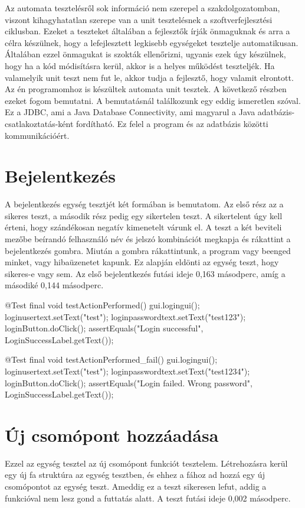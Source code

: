 
Az automata tesztelésről sok információ nem szerepel a szakdolgozatomban, viszont kihagyhatatlan szerepe van a unit tesztelésnek a szoftverfejlesztési ciklusban. Ezeket a teszteket általában a fejlesztők írják önmaguknak és arra a célra készülnek, hogy a lefejlesztett legkisebb egységeket tesztelje automatikusan. Általában ezzel önmagukat is szokták ellenőrizni, ugyanis ezek úgy készülnek, hogy ha a kód módisításra kerül, akkor is a helyes működést teszteljék. Ha valamelyik unit teszt nem fut le, akkor tudja a fejlesztő, hogy valamit elrontott.\\

Az én programomhoz is készültek automata unit tesztek. A következő részben ezeket fogom bemutatni. A bemutatásnál találkozunk egy eddig ismeretlen szóval. Ez a JDBC, ami a Java Database Connectivity, ami magyarul a Java adatbázis-csatlakoztatás-ként fordítható. Ez felel a program és az adatbázis közötti kommunikációért.

\section{Bejelentkezés} A bejelentkezés egység tesztjét két formában is bemutatom. Az első rész az a sikeres teszt, a második rész pedig egy sikertelen teszt. A sikertelent úgy kell érteni, hogy szándékosan negatív kimenetelt várunk el. A teszt a két beviteli mezőbe beírandó felhasználó név és jelszó kombinációt megkapja és rákattint a bejelentkezés gombra. Miután a gombra rákattintunk, a program vagy beenged minket, vagy hibaüzenetet kapunk. Ez alapján eldönti az egység teszt, hogy sikeres-e vagy sem. Az első bejelentkezés futási ideje 0,163 másodperc, amíg a másodiké 0,144 másodperc.

\begin{java}
@Test
final void testActionPerformed() {
	gui.logingui();
	loginusertext.setText("test");
	loginpasswordtext.setText("test123");
	loginButton.doClick();
	assertEquals("Login successful",
	LoginSuccessLabel.getText());
}

@Test
final void testActionPerformed_fail() {
	gui.logingui();
	loginusertext.setText("test");
	loginpasswordtext.setText("test1234");
	loginButton.doClick();
	assertEquals("Login failed. Wrong password",
	LoginSuccessLabel.getText());
}	
\end{java}

\section{Új csomópont hozzáadása} Ezzel az egység tesztel az új csomópont funkciót tesztelem. Létrehozásra kerül egy új fa struktúra az egység tesztben, és ehhez a fához ad hozzá egy új csomópontot az egység teszt. Ameddig ez a teszt sikeresen lefut, addig a funkcióval nem lesz gond a futtatás alatt. A teszt futási ideje 0,002 másodperc.

